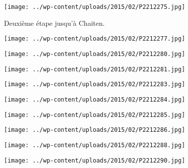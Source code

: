  

\begin{center} \texttt{[image: ../wp-content/uploads/2015/02/P2212275.jpg]} \end{center}

Deuxième étape jusqu'à Chaiten.

 

\begin{center} \texttt{[image: ../wp-content/uploads/2015/02/P2212277.jpg]} \end{center}

 

\begin{center} \texttt{[image: ../wp-content/uploads/2015/02/P2212280.jpg]} \end{center}

 

\begin{center} \texttt{[image: ../wp-content/uploads/2015/02/P2212281.jpg]} \end{center}

 

\begin{center} \texttt{[image: ../wp-content/uploads/2015/02/P2212283.jpg]} \end{center}

 

\begin{center} \texttt{[image: ../wp-content/uploads/2015/02/P2212284.jpg]} \end{center}

 

\begin{center} \texttt{[image: ../wp-content/uploads/2015/02/P2212285.jpg]} \end{center}

 

\begin{center} \texttt{[image: ../wp-content/uploads/2015/02/P2212286.jpg]} \end{center}

 

\begin{center} \texttt{[image: ../wp-content/uploads/2015/02/P2212288.jpg]} \end{center}

 

\begin{center} \texttt{[image: ../wp-content/uploads/2015/02/P2212290.jpg]} \end{center}

